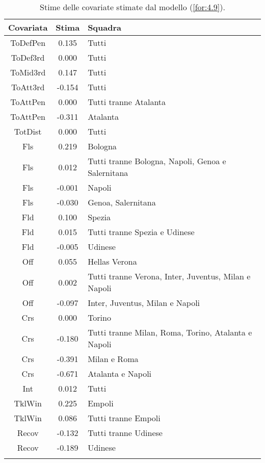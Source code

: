 \begin{table}[!htbp]%
	
	\renewcommand{\arraystretch}{1.7}
	\centering
	\begin{tabular}{ccp{10cm}}
		\hline			
		\textbf{Covariata} & \textbf{Stima} & \textbf{Squadra} \\	
		\hline
		ToDefPen & 0.135 & Tutti \\      
		ToDef3rd & 0.000 & Tutti \\
		ToMid3rd & 0.147 &Tutti\\
		ToAtt3rd & -0.154 & Tutti \\  
		ToAttPen & 0.000 & Tutti tranne Atalanta \\    
		ToAttPen & -0.311 & Atalanta \\ 	     	 
		TotDist & 0.000 & Tutti \\	
		Fls & 0.219 & Bologna  \\
		Fls & 0.012 & Tutti tranne Bologna, Napoli, Genoa e Salernitana  \\ 		
		Fls & -0.001 & Napoli  \\
		Fls & -0.030 & Genoa, Salernitana  \\
		Fld & 0.100 & Spezia \\
		Fld & 0.015 & Tutti tranne Spezia e Udinese  \\
		Fld & -0.005 & Udinese \\
		Off & 0.055 & Hellas Verona\\
		Off & 0.002 & Tutti tranne Verona, Inter, Juventus, Milan e Napoli\\
		Off & -0.097 & Inter, Juventus, Milan e Napoli  \\
		Crs & 0.000 & Torino\\
		Crs & -0.180 & Tutti tranne Milan, Roma, Torino, Atalanta e Napoli\\
		Crs & -0.391 & Milan e Roma\\
		Crs & -0.671 & Atalanta e Napoli\\
		Int & 0.012 & Tutti\\
		TklWin &  0.225 & Empoli  \\
		TklWin &  0.086 & Tutti tranne Empoli  \\ 
		Recov &  -0.132& Tutti tranne Udinese \\ 
		Recov &  -0.189& Udinese \\ 
		\hline
		& &  \\
		
	\end{tabular} \hbox{}
	\caption{Stime delle covariate stimate dal modello (\ref{for:4.9}).} \label{tab:BTCL3} 
\end{table}
 
